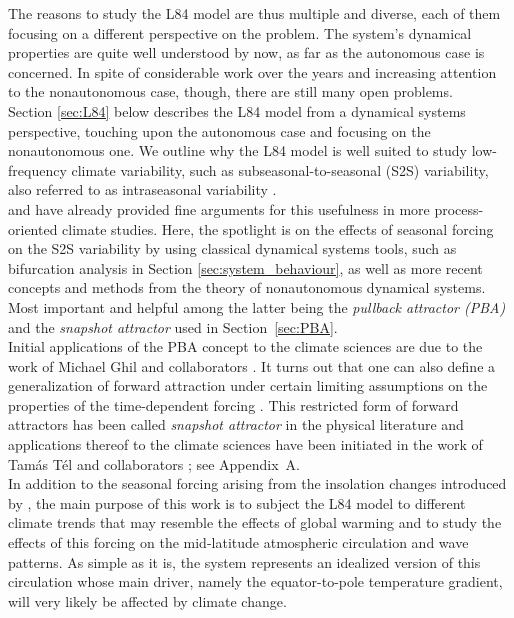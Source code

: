 \documentclass[%
 aip, cha,
 amsmath,amssymb,
 reprint,%
author-year,%
]{revtex4-1}
\newcommand{\0}{\mathbf 0}
\begin{document}
The reasons to study the L84 model are thus multiple and diverse, each of them focusing on a different perspective on the problem. The system's dynamical properties are quite well understood by now, as far as the autonomous case is concerned. In spite of considerable work over the years and increasing attention to the nonautonomous case, though, there are still many open problems.\\ 
Section \ref{sec:L84} below describes the L84 model from a dynamical systems perspective, touching upon the autonomous case and focusing on the nonautonomous one. We outline why the L84 model is well suited to study low-frequency climate variability, such as subseasonal-to-seasonal (S2S) variability, also referred to as intraseasonal variability \citep{ghil_S2S}. \\
\cite{lorenz84} and \cite{lorenz90} have already provided fine arguments for this usefulness in more process-oriented climate studies.  Here, the spotlight is on the effects of seasonal forcing on the S2S variability by using classical dynamical systems tools, such as bifurcation analysis in Section \ref{sec:system_behaviour}, as well as more recent concepts and methods from the theory of nonautonomous dynamical systems. Most important and helpful among the latter being the {\em pullback attractor (PBA)} and the {\em snapshot attractor} used in Section~\ref{sec:PBA}. \\
Initial applications of the PBA concept to the climate sciences are due to the work of Michael Ghil and collaborators \citep{ghil_PBA, chekroun}. It turns out that one can also define a generalization of forward attraction under certain limiting assumptions on the properties of the time-dependent forcing \citep{Car.Han.2016, Kloeden.Yang.2020}. This restricted form of forward attractors has been called {\em snapshot attractor} in the physical literature \citep{Namenson.ea.1996} and applications thereof to the climate sciences have been initiated  in the work of Tamás Tél and collaborators \citep{Bodai.Tel.2012, Tel.ea.2020}; see Appendix~A. \\
In addition to the seasonal forcing arising from the insolation changes introduced by \cite{lorenz90}, the main purpose of this work is to subject the L84 model to different climate trends that may resemble the effects of global warming and to study the effects of this forcing on the mid-latitude atmospheric circulation and wave patterns. As simple as it is, the system represents an idealized version of this circulation whose main driver, namely the equator-to-pole temperature gradient, will very likely be affected by climate change. \\
\end{document}
